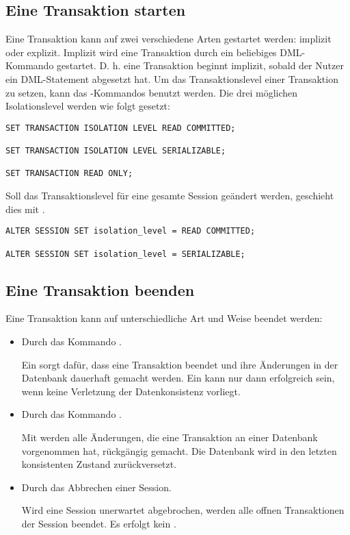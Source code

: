       \subsection{Eine Transaktion starten}
        Eine Transaktion kann auf zwei verschiedene Arten gestartet werden: implizit oder explizit. Implizit wird eine Transaktion durch ein beliebiges DML-Kommando gestartet. D. h. eine Transaktion beginnt implizit, sobald der Nutzer ein DML-Statement abgesetzt hat.
\clearpage
        Um das Transaktionslevel einer Transaktion zu setzen, kann das
        -Kommandos benutzt
        werden. Die drei möglichen Isolationslevel werden wie folgt gesetzt:
        \begin{lstlisting}[caption={Isolationslevel einer Transaktion
        wählen},label=admin401,language=oracle_sql]
SET TRANSACTION ISOLATION LEVEL READ COMMITTED;

SET TRANSACTION ISOLATION LEVEL SERIALIZABLE;

SET TRANSACTION READ ONLY;
        \end{lstlisting}
        Soll das Transaktionslevel für eine gesamte Session geändert werden,
        geschieht dies mit .
        \begin{lstlisting}[caption={Isolationslevel einer Session wählen},label=admin402,language=oracle_sql]
ALTER SESSION SET isolation_level = READ COMMITTED;

ALTER SESSION SET isolation_level = SERIALIZABLE;
        \end{lstlisting}
      \subsection{Eine Transaktion beenden}
        Eine Transaktion kann auf unterschiedliche Art und Weise beendet werden:
        \begin{itemize}
          \item Durch das Kommando .

          Ein  sorgt dafür, dass eine Transaktion beendet und ihre Änderungen in der Datenbank dauerhaft gemacht werden. Ein  kann nur dann erfolgreich sein, wenn keine Verletzung der Datenkonsistenz vorliegt.
          \item Durch das Kommando .

          Mit  werden alle Änderungen, die eine Transaktion an einer Datenbank vorgenommen hat, rückgängig gemacht. Die Datenbank wird in den letzten konsistenten Zustand zurückversetzt.
          \item Durch das Abbrechen einer Session.

          Wird eine Session unerwartet abgebrochen, werden alle offnen Transaktionen der Session beendet. Es erfolgt kein .
        \end{itemize}
